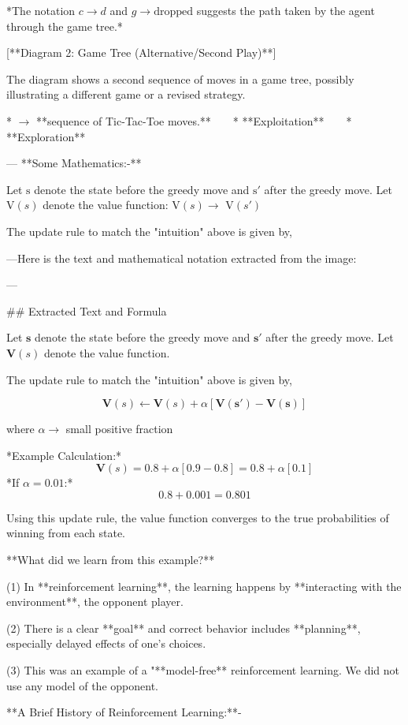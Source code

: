 *The notation $c \to d$ and $g \to \text{dropped}$ suggests the path taken by the agent through the game tree.*

[**Diagram 2: Game Tree (Alternative/Second Play)**]

The diagram shows a second sequence of moves in a game tree, possibly illustrating a different game or a revised strategy.

* $\to$ **sequence of Tic-Tac-Toe moves.**
    * **Exploitation**
    * **Exploration**

---
**Some Mathematics:-**

Let $\text{s}$ denote the state before the greedy move and $\text{s}'$ after the greedy move. Let $\text{V}(s)$ denote the value function:
$\text{V}(s) \to$
$\text{V}(s')$

The update rule to match the "intuition" above is given by,

---Here is the text and mathematical notation extracted from the image:

---

## Extracted Text and Formula

Let $\mathbf{s}$ denote the state before the greedy move and $\mathbf{s}'$ after the greedy move. Let $\mathbf{V}(s)$ denote the value function.

The update rule to match the "intuition" above is given by,

$$\mathbf{V}(s) \leftarrow \mathbf{V}(s) + \alpha \mathbf{[V(s') - V(s)]}$$

where $\alpha \rightarrow$ small positive fraction

*Example Calculation:*
$$\mathbf{V}(s) = 0.8 + \alpha [0.9 - 0.8] = 0.8 + \alpha [0.1]$$*If $\alpha = 0.01$:*$$0.8 + 0.001 = 0.801$$

Using this update rule, the value function converges to the true probabilities of winning from each state.

**What did we learn from this example?**

(1) In **reinforcement learning**, the learning happens by **interacting with the environment**, the opponent player.

(2) There is a clear **goal** and correct behavior includes **planning**, especially delayed effects of one's choices.

(3) This was an example of a "**model-free** reinforcement learning. We did not use any model of the opponent.

**A Brief History of Reinforcement Learning:**-

